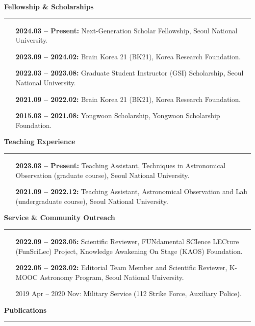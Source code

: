 \documentclass[11pt]{article}
\begin{document}
\textbf{\large \textsf{Fellowship \& Scholarships}}
\vspace{3pt}
\hrule
\begin{itemize}[leftmargin=115pt, noitemsep]
    \item[\textbf{2024.03 -- Present:}] Next-Generation Scholar Fellowship, Seoul National University.
    \item[\textbf{2023.09 -- 2024.02:}] Brain Korea 21 (BK21), Korea Research Foundation.
    \item[\textbf{2022.03 -- 2023.08:}] Graduate Student Instructor (GSI) Scholarship, Seoul National University.
    \item[\textbf{2021.09 -- 2022.02:}] Brain Korea 21 (BK21), Korea Research Foundation.
    \item[\textbf{2015.03 -- 2021.08:}] Yongwoon Scholarship, Yongwoon Scholarship Foundation.
\end{itemize}


\textbf{\large \textsf{Teaching Experience}}
\vspace{3pt}
\hrule
\begin{itemize}[leftmargin=115pt, noitemsep]
    \item[\textbf{2023.03 -- Present:}] Teaching Assistant, Techniques in Astronomical Observation (graduate course), Seoul National University.
    \item[\textbf{2021.09 -- 2022.12:}] Teaching Assistant, Astronomical Observation and Lab (undergraduate course), Seoul National University.
\end{itemize}


\textbf{\large \textsf{Service \& Community Outreach}}
\vspace{3pt}
\hrule
\begin{itemize}[leftmargin=115pt, noitemsep]
    \item[\textbf{2022.09 -- 2023.05:}] Scientific Reviewer, FUNdamental SCIence LECture (FunSciLec) Project, Knowledge Awakening On Stage (KAOS) Foundation.
    \item[\textbf{2022.05 -- 2023.02:}] Editorial Team Member and Scientific Reviewer, K-MOOC Astronomy Program, Seoul National University.
    \item[2019 Apr -- 2020 Nov:] Military Service (112 Strike Force, Auxiliary Police).
\end{itemize}


\textbf{\large \textsf{Publications}}
\vspace{3pt}
\hrule

\begin{etaremune}
    \item {}
    \item {}
    \item {}
\end{etaremune}

% 

\end{document}
